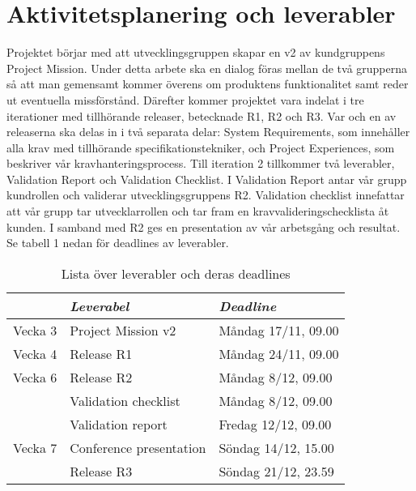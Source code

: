 \documentclass[10pt]{article}
\begin{document}
\section{Aktivitetsplanering och leverabler}
\sloppy
\noindent
Projektet börjar med att utvecklingsgruppen skapar en v2 av kundgruppens Project Mission. Under detta arbete ska en dialog föras mellan de två grupperna så att man gemensamt kommer överens om produktens funktionalitet samt reder ut eventuella missförstånd.  
Därefter kommer projektet vara indelat i tre iterationer med tillhörande releaser, betecknade R1, R2 och R3. Var och en av releaserna ska delas in i två separata delar: System Requirements, som innehåller alla krav med tillhörande specifikationstekniker, och Project Experiences, som beskriver vår kravhanteringsprocess. Till iteration 2 tillkommer två leverabler, Validation Report och Validation Checklist. I Validation Report antar vår grupp kundrollen och validerar utvecklingsgruppens R2. Validation checklist innefattar att vår grupp tar utvecklarrollen och tar fram en kravvalideringschecklista åt kunden. I samband med R2 ges en presentation av vår arbetsgång och resultat. Se tabell 1 nedan för deadlines av leverabler.  

\begin{table}[htbp] %
  \begin{center}
    \begin{tabular}{l|ll}
      & \emph{Leverabel} & \emph{Deadline} \\ \hline
      Vecka 3      & Project Mission v2        & Måndag 17/11, 09.00 \\
      Vecka 4      & Release R1                & Måndag 24/11, 09.00 \\
      Vecka 6      & Release R2                & Måndag 8/12,  09.00 \\
                    & Validation checklist      & Måndag 8/12, 09.00 \\
                    & Validation report         & Fredag 12/12, 09.00 \\
      Vecka 7      & Conference presentation   & Söndag 14/12, 15.00 \\
                    & Release R3                & Söndag 21/12, 23.59 \\
     \hline               
    \end{tabular}
  \end{center}
  \caption{Lista över leverabler och deras deadlines}
\end{table}
\end{document}
